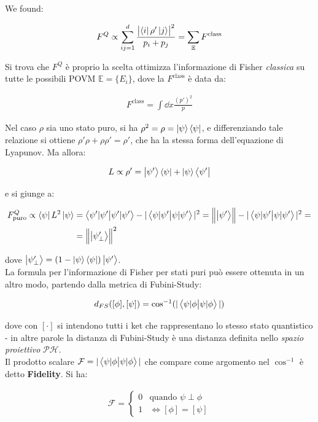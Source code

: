 \documentclass[main.tex]{subfiles}
\begin{document}
We found:

\begin{align*}
F^Q \propto \sum_{ij=1}^d \frac{\abs{\bra{i}\rho'\ket{j}}^2}{p_i + p_j} = \sum_{\mathbb{E}} F^{\text{class}}
\end{align*}

Si trova che $F^Q$ è proprio la scelta ottimizza l'informazione di Fisher \textit{classica} su tutte le possibili POVM $\mathbb{E}=\{E_i\}$, dove la $F^{\mathrm{class}}$ è data da:

\begin{align*}
F^{\text{class}} = \int \dd{x} \frac{(p')^2}{p}
\end{align*}

Nel caso $\rho$ sia uno stato puro, si ha $\rho^2 = \rho = \ket{\psi}\bra{\psi}$, e differenziando tale relazione si ottiene $\rho'\rho + \rho \rho' = \rho'$, che ha la stessa forma dell'equazione di Lyapunov. Ma allora:

\begin{align*}
L \propto \rho' = \ket{\psi'}\bra{\psi} + \ket{\psi}\bra{\psi'}
\end{align*}

e si giunge a:

\begin{align*}
F^{Q}_{\mathrm{puro}} \propto \bra{\psi}L^2 \ket{\psi} &= \braket{\psi'|\psi'} - |\braket{\psi|\psi'}|^2 = \norm{\ket{\psi'}}
-|\braket{\psi|\psi'}|^2 =\\
&= \norm{\ket{\psi_\perp'}}^2
\end{align*}

dove $\ket{\psi_\perp'}=(1-\ket{\psi}\bra{\psi})\ket{\psi'}$.\\

La formula per l'informazione di Fisher per stati puri può essere ottenuta in un altro modo, partendo dalla metrica di Fubini-Study:

\begin{align*}
d_{FS} ([\phi], [\psi]) = \cos^{-1}(|\braket{\psi|\phi}|)
\end{align*}

dove con $[\cdot]$ si intendono tutti i ket che rappresentano lo stesso stato quantistico - in altre parole la distanza di Fubini-Study è una distanza definita nello \textit{spazio proiettivo} $\mathcal{P}\mathcal{H}$.\\
Il prodotto scalare $\mathcal{F}=|\braket{\psi|\phi}|$ che compare come argomento nel $\cos^{-1}$ è detto \textbf{Fidelity}. Si ha:

\begin{align*}
\mathcal{F} = \begin{cases}
0 & \text{quando } \psi \perp \phi\\
1 & \Leftrightarrow [\phi]=[\psi]
\end{cases}
\end{align*}
\end{document}
